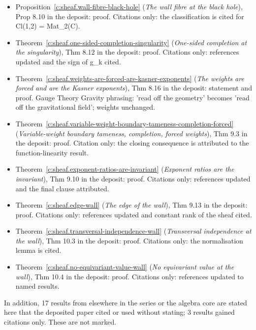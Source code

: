 \documentclass[11pt]{article}
\theoremstyle{definition}
\theoremstyle{plain}
\begin{document}
\begin{itemize}
\item Proposition~\ref{c:sheaf.wall-fibre-black-hole} (\emph{The wall fibre at the black hole}), Prop 8.10 in the deposit: proof. Citations only: the classification is cited for Cl(1,2) = Mat\_2(C).
\item Theorem~\ref{c:sheaf.one-sided-completion-singularity} (\emph{One-sided completion at the singularity}), Thm 8.12 in the deposit: proof. Citations only: references updated and the sign of g\_k cited.
\item Theorem~\ref{c:sheaf.weights-are-forced-are-kasner-exponents} (\emph{The weights are forced and are the Kasner exponents}), Thm 8.16 in the deposit: statement and proof. Gauge Theory Gravity phrasing: 'read off the geometry' becomes 'read off the gravitational field'; weights unchanged.
\item Theorem~\ref{c:sheaf.variable-weight-boundary-tameness-completion-forced} (\emph{Variable-weight boundary tameness, completion, forced weights}), Thm 9.3 in the deposit: proof. Citation only: the closing consequence is attributed to the function-linearity result.
\item Theorem~\ref{c:sheaf.exponent-ratios-are-invariant} (\emph{Exponent ratios are the invariant}), Thm 9.10 in the deposit: proof. Citations only: references updated and the final clause attributed.
\item Theorem~\ref{c:sheaf.edge-wall} (\emph{The edge of the wall}), Thm 9.13 in the deposit: proof. Citations only: references updated and constant rank of the sheaf cited.
\item Theorem~\ref{c:sheaf.transversal-independence-wall} (\emph{Transversal independence at the wall}), Thm 10.3 in the deposit: proof. Citations only: the normalisation lemma is cited.
\item Theorem~\ref{c:sheaf.no-equivariant-value-wall} (\emph{No equivariant value at the wall}), Thm 10.4 in the deposit: proof. Citations only: references updated to named results.
\end{itemize}
\noindent In addition, 17 results from elsewhere in the series or the algebra core are stated here that the deposited paper cited or used without stating; 3 results gained citations only. These are not marked.
\end{document}
